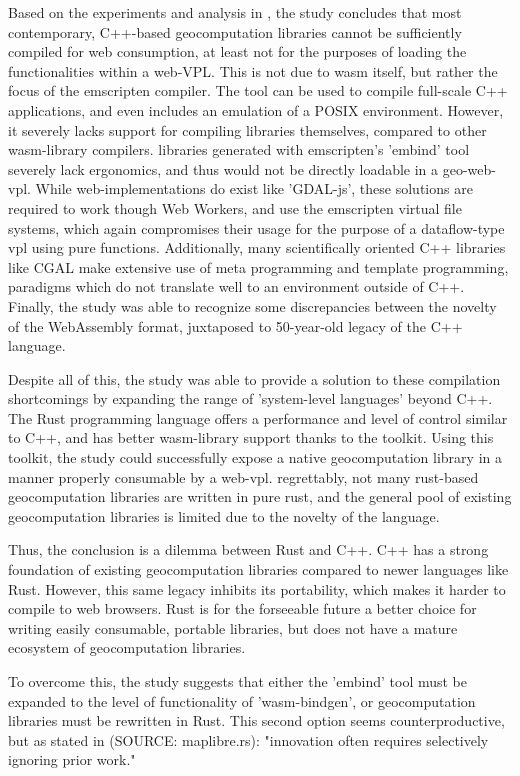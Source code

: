 Based on the experiments and analysis in , the study concludes that most contemporary, C++-based geocomputation libraries cannot be sufficiently compiled for web consumption, at least not for the purposes of loading the functionalities within a web-VPL.    
This is not due to wasm itself, but rather the focus of the emscripten compiler.
The tool can be used to compile full-scale C++ applications, and even includes an emulation of a POSIX environment.
However, it severely lacks support for compiling libraries themselves, compared to other wasm-library compilers.
libraries generated with emscripten's 'embind' tool severely lack ergonomics, and thus would not be directly loadable in a geo-web-vpl.
While web-implementations do exist like 'GDAL-js', these solutions are required to work though Web Workers, and use the emscripten virtual file systems, which again compromises their usage for the purpose of a dataflow-type vpl using pure functions.
Additionally, many scientifically oriented C++ libraries like CGAL make extensive use of meta programming and template programming, paradigms which do not translate well to an environment outside of C++. 
Finally, the study was able to recognize some discrepancies between the novelty of the WebAssembly format, juxtaposed to 50-year-old legacy of the C++ language.

Despite all of this, the study was able to provide a solution to these compilation shortcomings by expanding the range of 'system-level languages' beyond C++. 
The Rust programming language offers a performance and level of control similar to C++, and has better wasm-library support thanks to the  toolkit. 
Using this toolkit, the study could successfully expose a native geocomputation library in a manner properly consumable by a web-vpl.
regrettably, not many rust-based geocomputation libraries are written in pure rust, and the general pool of existing geocomputation libraries is limited due to the novelty of the language. 

Thus, the conclusion is a dilemma between Rust and C++.
C++ has a strong foundation of existing geocomputation libraries compared to newer languages like Rust.  
However, this same legacy inhibits its portability, which makes it harder to compile to web browsers. 
Rust is for the forseeable future a better choice for writing easily consumable, portable libraries, but does not have a mature ecosystem of geocomputation libraries. 

To overcome this, the study suggests that either the 'embind' tool must be expanded to the level of functionality of 'wasm-bindgen', or geocomputation libraries must be rewritten in Rust. 
This second option seems counterproductive, but as stated in (SOURCE: maplibre.rs): "innovation often requires selectively ignoring prior work."

